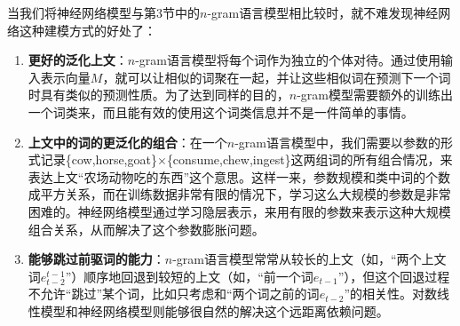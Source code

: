 \documentclass[10pt,a4paper]{ctexart}
\begin{document}
当我们将神经网络模型与第3节中的$n$-gram语言模型相比较时，就不难发现神经网络这种建模方式的好处了：
\begin{enumerate}
\item[] \textbf{更好的泛化上文}：$n$-gram语言模型将每个词作为独立的个体对待。通过使用输入表示向量$M$，就可以让相似的词聚在一起，并让这些相似词在预测下一个词时具有类似的预测性质。为了达到同样的目的，$n$-gram模型需要额外的训练出一个词类来，而且能有效的使用这个词类信息并不是一件简单的事情\cite{brown1992class}。
\item[] \textbf{上文中的词的更泛化的组合}：在一个$n$-gram语言模型中，我们需要以参数的形式记录\{cow,horse,goat\}$\times$\{consume,chew,ingest\}这两组词的所有组合情况，来表达上文“农场动物吃的东西”这个意思。这样一来，参数规模和类中词的个数成平方关系，而在训练数据非常有限的情况下，学习这么大规模的参数是非常困难的。神经网络模型通过学习隐层表示，来用有限的参数来表示这种大规模组合关系，从而解决了这个参数膨胀问题。
\item[] \textbf{能够跳过前驱词的能力}：$n$-gram语言模型常常从较长的上文（如，“两个上文词$e_{t-2}^{t-1}$”）顺序地回退到较短的上文（如，“前一个词$e_{t-1}$”），但这个回退过程不允许“跳过”某个词，比如只考虑和“两个词之前的词$e_{t-2}$”的相关性。对数线性模型和神经网络模型则能够很自然的解决这个远距离依赖问题。
\end{enumerate}
\end{document}
